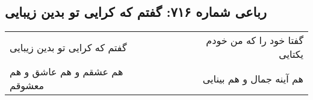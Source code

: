 \begin{center}
\section*{رباعی شماره ۷۱۶: گفتم که کرایی تو بدین زیبایی}
\label{sec:sh716}
\begin{longtable}{l p{0.5cm} r}
گفتم که کرایی تو بدین زیبایی
&&
گفتا خود را که من خودم یکتایی
\\
هم عشقم و هم عاشق و هم معشوقم
&&
هم آینه جمال و هم بینایی
\\
\end{longtable}
\end{center}
